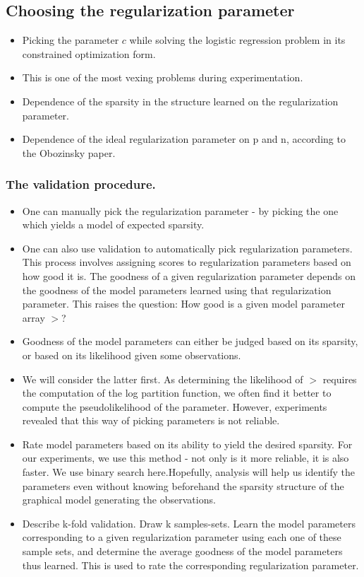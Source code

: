 \documentclass{article}
\begin{document}
\subsection{Choosing the regularization parameter}
\begin{itemize}
 \item Picking the parameter $c$ while solving the logistic regression problem in its constrained optimization form.
 \item This is one of the most vexing problems during experimentation.
 \item Dependence of the sparsity in the structure learned on the regularization parameter.
 \item Dependence of the ideal regularization parameter on p and n, according to the Obozinsky paper.
\end{itemize}

\subsubsection{The validation procedure.}
\begin{itemize}
 \item One can manually pick the regularization parameter - by picking the one which yields a model of expected sparsity.
 \item One can also use validation to automatically pick regularization parameters. This process involves assigning scores to regularization parameters based on how good it is. The goodness of a given regularization parameter depends on the goodness of the model parameters learned using that regularization parameter. This raises the question: How good is a given model parameter array $\gt$?
 \item Goodness of the model parameters can either be judged based on its sparsity, or based on its likelihood given some observations.
 \item We will consider the latter first. As determining the likelihood of $\gt$ requires the computation of the log partition function, we often find it better to compute the pseudolikelihood of the parameter. However, experiments revealed that this way of picking parameters is not reliable.
 \item Rate model parameters based on its ability to yield the desired sparsity. For our experiments, we use this method - not only is it more reliable, it is also faster. We use binary search here.\chk Hopefully, analysis will help us identify the parameters even without knowing beforehand the sparsity structure of the graphical model generating the observations.
 \item Describe k-fold validation. Draw k samples-sets. Learn the model parameters corresponding to a given regularization parameter using each one of these sample sets, and determine the average goodness of the model parameters thus learned. This is used to rate the corresponding regularization parameter.
\end{itemize}
\end{document}
